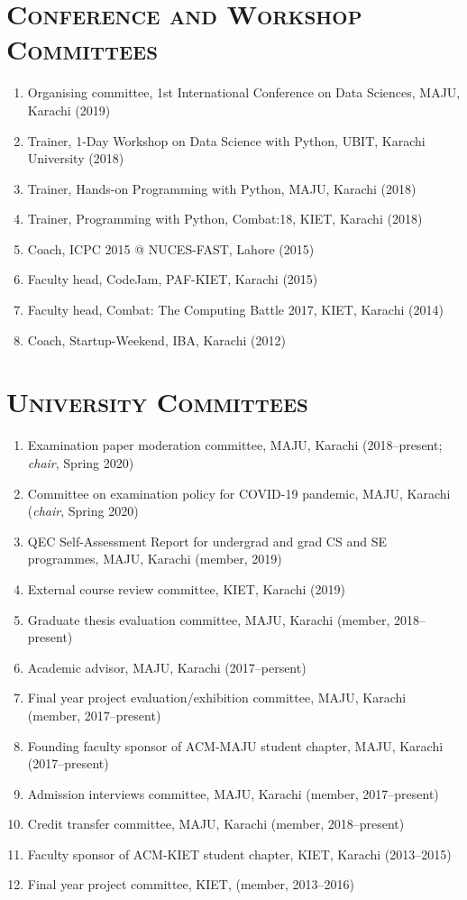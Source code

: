 \documentclass[a4paper, 10pt]{article}
\begin{document}
\section*{\normalfont\textsc{Conference and Workshop Committees}}
\begin{enumerate}
\itemsep-4pt
\item Organising committee, 1st International Conference on Data Sciences, MAJU, Karachi (2019)
\item Trainer, 1-Day Workshop on Data Science with Python, UBIT, Karachi University (2018)
\item  Trainer, Hands-on Programming with Python, MAJU, Karachi (2018)
\item  Trainer, Programming with Python, Combat:18, KIET, Karachi (2018)
\item  Coach, ICPC 2015 @ NUCES-FAST, Lahore (2015)
\item  Faculty head, CodeJam, PAF-KIET, Karachi (2015)
\item  Faculty head, Combat: The Computing Battle 2017, KIET, Karachi (2014)
\item  Coach, Startup-Weekend, IBA, Karachi (2012)
\end{enumerate}

\section*{\normalfont\textsc{University Committees}}
\begin{enumerate}
\itemsep-4pt 
\item Examination paper moderation committee, MAJU, Karachi (2018--present; \emph{chair}, Spring 2020)
\item Committee on examination policy for COVID-19 pandemic, MAJU, Karachi (\emph{chair}, Spring 2020)
\item QEC Self-Assessment Report for undergrad and grad CS and SE programmes, MAJU, Karachi (member, 2019)
\item External course review committee, KIET, Karachi (2019)
\item Graduate thesis evaluation committee, MAJU, Karachi (member, 2018--present)
\item Academic advisor, MAJU, Karachi (2017--persent)
\item Final year project evaluation/exhibition committee, MAJU, Karachi (member, 2017--present)
\item Founding faculty sponsor of ACM-MAJU student chapter, MAJU, Karachi (2017--present)
\item Admission interviews committee, MAJU, Karachi (member, 2017--present)
\item Credit transfer committee, MAJU, Karachi (member, 2018--present)
\item Faculty sponsor of ACM-KIET student chapter, KIET, Karachi (2013--2015)
\item Final year project committee, KIET, (member, 2013--2016)
\end{enumerate}
\end{document}
